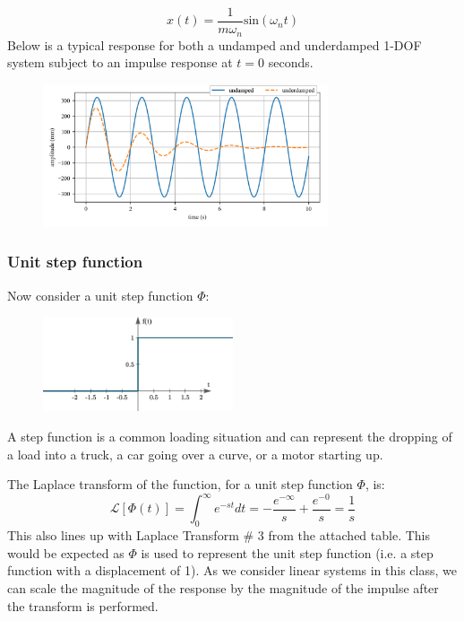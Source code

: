 \documentclass[12pt,letter]{article}
\numberwithin{ex}{section} %
\newcommand{\Laplace}[1]{\ensuremath{\mathcal{L}{\left[#1\right]}}}
\begin{document}
\begin{equation}
x(t) = \frac{1}{m \omega_n}\text{sin}(\omega_n t)
\end{equation}
Below is a typical response for both a undamped and underdamped 1-DOF system subject to an impulse response at $t=0$ seconds. 
\begin{figure}[H]
	\centering
	\includegraphics[width=0.75\textwidth]{../Figures/response_impulse.png}
\end{figure}



\subsubsection{Unit step function}
Now consider a unit step function $\Phi$: 

\begin{figure}[H]
	\centering
	\includegraphics[width=0.5\textwidth]{../Figures/unit_step_function.png}
\end{figure}

A step function is a common loading situation and can represent the dropping of a load into a truck, a car going over a curve, or a motor starting up. 


The Laplace transform of the function, for a unit step function $\Phi$, is: 
\begin{equation*}
\Laplace{\Phi(t)} = \int_{0}^{\infty} e^{-st}dt = -\frac{e^{-\infty}}{s} +\frac{e^{-0}}{s} =\frac{1}{s}
\end{equation*}
This also lines up with Laplace Transform \# 3 from the attached table. This would be expected as $\Phi$ is used to represent the unit step function (i.e. a step function with a displacement of 1). As we consider linear systems in this class, we can scale the magnitude of the response by the magnitude of the impulse after the transform is performed. 
\end{document}
